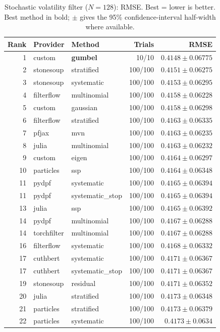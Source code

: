 \begin{table}[!htbp]
\centering
\small
\caption{Stochastic volatility filter ($N=128$): RMSE. Best = lower is better. Best method in bold; $\pm$ gives the 95\% confidence-interval half-width where available.}
\label{tab:stochastic-volatility-filter-rmse}
\begin{tabular}{rllrr}
\toprule
Rank & Provider & Method & Trials & RMSE \\
\midrule
1 & custom & \textbf{gumbel} & 10/10 & $\mathbf{0.4148 \pm 0.06775}$ \\
2 & stonesoup & stratified & 100/100 & $0.4151 \pm 0.06275$ \\
3 & stonesoup & systematic & 100/100 & $0.4153 \pm 0.06295$ \\
4 & filterflow & multinomial & 100/100 & $0.4158 \pm 0.06228$ \\
5 & custom & gaussian & 100/100 & $0.4158 \pm 0.06298$ \\
6 & filterflow & stratified & 100/100 & $0.4163 \pm 0.06335$ \\
7 & pfjax & mvn & 100/100 & $0.4163 \pm 0.06235$ \\
8 & julia & multinomial & 100/100 & $0.4163 \pm 0.06232$ \\
9 & custom & eigen & 100/100 & $0.4164 \pm 0.06297$ \\
10 & particles & ssp & 100/100 & $0.4164 \pm 0.06348$ \\
11 & pydpf & systematic & 100/100 & $0.4165 \pm 0.06394$ \\
11 & pydpf & systematic\_stop & 100/100 & $0.4165 \pm 0.06394$ \\
13 & julia & ssp & 100/100 & $0.4165 \pm 0.06392$ \\
14 & pydpf & multinomial & 100/100 & $0.4167 \pm 0.06288$ \\
14 & torchfilter & multinomial & 100/100 & $0.4167 \pm 0.06288$ \\
16 & filterflow & systematic & 100/100 & $0.4168 \pm 0.06332$ \\
17 & cuthbert & systematic & 100/100 & $0.4171 \pm 0.06367$ \\
17 & cuthbert & systematic\_stop & 100/100 & $0.4171 \pm 0.06367$ \\
19 & stonesoup & residual & 100/100 & $0.4171 \pm 0.06352$ \\
20 & julia & stratified & 100/100 & $0.4173 \pm 0.06348$ \\
21 & particles & stratified & 100/100 & $0.4173 \pm 0.06379$ \\
22 & particles & systematic & 100/100 & $0.4173 \pm 0.0634$ \\

\end{tabular}
\end{table}

